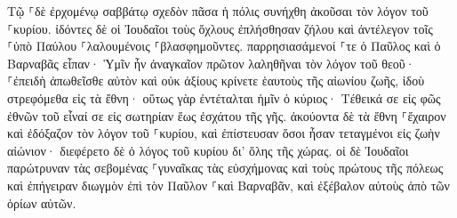 \documentclass{openreader}
\begin{document}
Τῷ ⸀δὲ ἐρχομένῳ σαββάτῳ σχεδὸν πᾶσα ἡ πόλις συνήχθη ἀκοῦσαι τὸν λόγον τοῦ ⸀κυρίου. 
ἰδόντες δὲ οἱ Ἰουδαῖοι τοὺς ὄχλους ἐπλήσθησαν ζήλου καὶ ἀντέλεγον τοῖς ⸀ὑπὸ Παύλου ⸀λαλουμένοις ⸀βλασφημοῦντες. 
παρρησιασάμενοί ⸀τε ὁ Παῦλος καὶ ὁ Βαρναβᾶς εἶπαν· Ὑμῖν ἦν ἀναγκαῖον πρῶτον λαληθῆναι τὸν λόγον τοῦ θεοῦ· ⸀ἐπειδὴ ἀπωθεῖσθε αὐτὸν καὶ οὐκ ἀξίους κρίνετε ἑαυτοὺς τῆς αἰωνίου ζωῆς, ἰδοὺ στρεφόμεθα εἰς τὰ ἔθνη· 
οὕτως γὰρ ἐντέταλται ἡμῖν ὁ κύριος· Τέθεικά σε εἰς φῶς ἐθνῶν τοῦ εἶναί σε εἰς σωτηρίαν ἕως ἐσχάτου τῆς γῆς. 
ἀκούοντα δὲ τὰ ἔθνη ⸀ἔχαιρον καὶ ἐδόξαζον τὸν λόγον τοῦ ⸀κυρίου, καὶ ἐπίστευσαν ὅσοι ἦσαν τεταγμένοι εἰς ζωὴν αἰώνιον· 
διεφέρετο δὲ ὁ λόγος τοῦ κυρίου δι’ ὅλης τῆς χώρας. 
οἱ δὲ Ἰουδαῖοι παρώτρυναν τὰς σεβομένας ⸀γυναῖκας τὰς εὐσχήμονας καὶ τοὺς πρώτους τῆς πόλεως καὶ ἐπήγειραν διωγμὸν ἐπὶ τὸν Παῦλον ⸀καὶ Βαρναβᾶν, καὶ ἐξέβαλον αὐτοὺς ἀπὸ τῶν ὁρίων αὐτῶν. 
\end{document}

